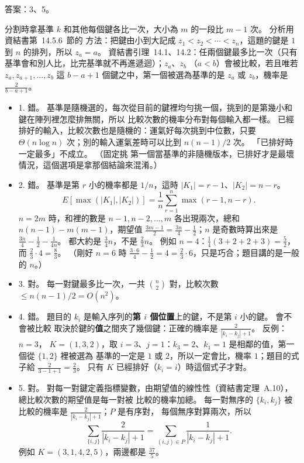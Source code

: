 \begin{pastsoln}
答案：3、5。

分割時拿基準 $k$ 和其他每個鍵各比一次，大小為 $m$ 的一段比 $m - 1$ 次。 分析用資結書第~14.5.6~節的
方法：把鍵由小到大記成 $z_1 < z_2 < \cdots < z_n$，這題的鍵是 $1$ 到 $n$ 的排列，所以 $z_a = a$。
資結書引理~14.1、14.2：任兩個鍵最多比一次（只有基準會和別人比，比完基準就不再進遞迴）；$z_a$、$z_b$
（$a < b$）會被比較，若且唯若 $z_a, z_{a+1}, \ldots, z_b$ 這 $b - a + 1$ 個鍵之中，第一個被選為基準的是
$z_a$ 或 $z_b$，機率是 $\frac{2}{b - a + 1}$。

\begin{itemize}
\item 1. 錯。 基準是隨機選的，每次從目前的鍵裡均勻挑一個，挑到的是第幾小和鍵在陣列裡怎麼排無關，所以
比較次數的機率分布對每個輸入都一樣。 已經排好的輸入，比較次數也是隨機的：運氣好每次挑到中位數，只要
$\Theta(n \log n)$ 次；別的輸入運氣差時可以比到 $n(n-1)/2$ 次。 「已排好時一定最多」不成立。 （固定挑
第一個當基準的非隨機版本，已排好才是最壞情況，這個選項是拿那個結論來混淆。）
\item 2. 錯。 基準是第 $r$ 小的機率都是 $1/n$，這時 $|K_1| = r - 1$、$|K_2| = n - r$。
\[
E[\max(|K_1|, |K_2|)] = \frac{1}{n}\sum_{r=1}^{n} \max(r - 1, n - r).
\]
$n = 2m$ 時，和裡的數是 $n-1, n-2, \ldots, m$ 各出現兩次，總和 $n(n-1) - m(m-1)$，期望值
$\frac{3m - 1}{2} = \frac{3n}{4} - \frac{1}{2}$；$n$ 是奇數時算出來是 $\frac{3n}{4} - \frac{1}{2} -
\frac{1}{4n}$。 都大約是 $\frac{3}{4}n$，不是 $\frac{2}{3}n$。 例如 $n = 4$：$\frac{1}{4}(3 + 2 + 2 + 3) =
\frac{5}{2}$，而 $\frac{2}{3} \cdot 4 = \frac{8}{3}$。 （剛好 $n = 6$ 時 $\frac{3 \cdot 6}{4} - \frac{1}{2}
= 4 = \frac{2}{3}\cdot 6$，只是巧合；題目講的是一般的 $n$。）
\item 3. 對。 每一對鍵最多比一次，一共 $\binom{n}{2}$ 對，比較次數 $\le n(n-1)/2 = O(n^2)$。
\item 4. 錯。 題目的 $k_i$ 是輸入序列的\textbf{第 $i$ 個位置}上的鍵，不是第 $i$ 小的鍵。 會不會被比較
取決於鍵的\textbf{值}之間夾了幾個鍵：正確的機率是 $\frac{2}{|k_i - k_j| + 1}$。 反例：$n = 3$，
$K = (1, 3, 2)$，取 $i = 3$、$j = 1$：$k_3 = 2$、$k_1 = 1$ 是相鄰的值，第一個從 $\{1, 2\}$ 裡被選為
基準的一定是 $1$ 或 $2$，所以一定會比，機率 $1$；題目的式子給 $\frac{2}{3 - 1 + 1} = \frac{2}{3}$。 只有
$K$ 已經排好（$k_i = i$）時這個式子才對。
\item 5. 對。 對每一對鍵定義指標變數，由期望值的線性性（資結書定理~A.10），總比較次數的期望值是每一對被
比較的機率加總。 每一對無序的 $\{k_i, k_j\}$ 被比較的機率是 $\frac{2}{|k_i - k_j| + 1}$；$P$ 是有序對，
每個無序對算兩次，所以
\[
\sum_{\{i, j\}} \frac{2}{|k_i - k_j| + 1} = \sum_{(i, j) \in P} \frac{1}{|k_i - k_j| + 1}.
\]
例如 $K = (3, 1, 4, 2, 5)$，兩邊都是 $\frac{37}{5}$。
\end{itemize}
\end{pastsoln}
